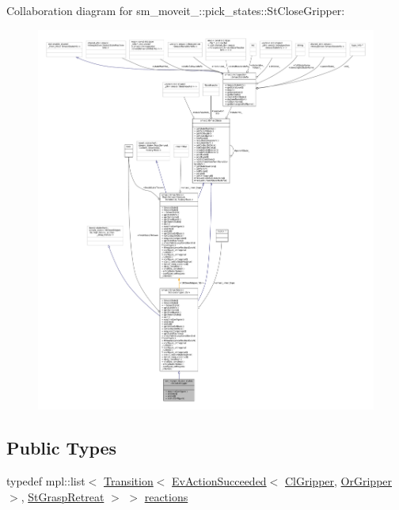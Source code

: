 Collaboration diagram for sm\+\_\+moveit\+\_\+:\+:pick\+\_\+states\+:\+:St\+Close\+Gripper\+:
\nopagebreak
\begin{figure}[H]
\begin{center}
\leavevmode
\includegraphics[width=350pt]{structsm__moveit__4_1_1pick__states_1_1StCloseGripper__coll__graph}
\end{center}
\end{figure}
\subsection*{Public Types}
\begin{DoxyCompactItemize}
\item 
typedef mpl\+::list$<$ \hyperlink{classsmacc_1_1Transition}{Transition}$<$ \hyperlink{structsmacc_1_1default__events_1_1EvActionSucceeded}{Ev\+Action\+Succeeded}$<$ \hyperlink{classsm__moveit__4_1_1cl__gripper_1_1ClGripper}{Cl\+Gripper}, \hyperlink{classsm__moveit__4_1_1OrGripper}{Or\+Gripper} $>$, \hyperlink{structsm__moveit__4_1_1pick__states_1_1StGraspRetreat}{St\+Grasp\+Retreat} $>$ $>$ \hyperlink{structsm__moveit__4_1_1pick__states_1_1StCloseGripper_a6934886ed914236301c2341e96264729}{reactions}
\end{DoxyCompactItemize}
